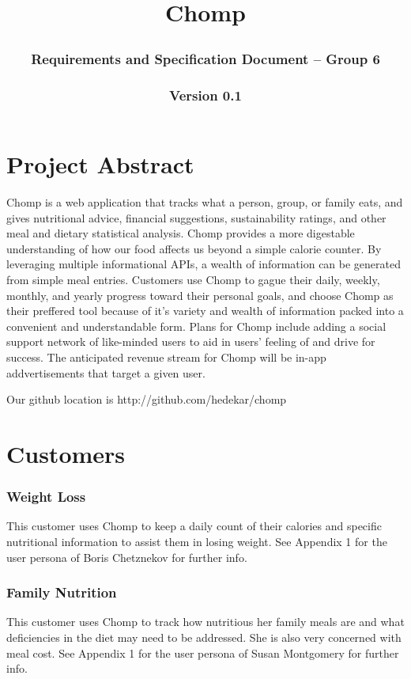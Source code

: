 \documentclass[a4paper,12pt]{article}
\begin{document}
\title{Chomp
\subsubsection*{Requirements and Specification Document -- Group 6}\subsubsection*{Version 0.1}
}\maketitle
\section*{Project Abstract}
Chomp is a web application that tracks what a person, group, or family eats, and gives nutritional advice, financial suggestions, sustainability ratings, and other meal and dietary statistical analysis.  Chomp provides a more digestable understanding of how our food affects us beyond a simple calorie counter.  By leveraging multiple informational APIs, a wealth of information can be generated from simple meal entries.  Customers use Chomp to gague their daily, weekly, monthly, and yearly progress toward their personal goals, and choose Chomp as their preffered tool because of it's variety and wealth of information packed into a convenient and understandable form.  Plans for Chomp include adding a social support network of like-minded users to aid in users' feeling of and drive for success.  The anticipated revenue stream for Chomp will be in-app addvertisements that target a given user.

Our github location is http://github.com/hedekar/chomp
\section*{Customers}
\subsubsection*{Weight Loss}
This customer uses Chomp to keep a daily count of their calories and specific nutritional information to assist them in losing weight.  See Appendix 1 for the user persona of Boris Chetznekov for further info.
\subsubsection*{Family Nutrition}
This customer uses Chomp to track how nutritious her family meals are and what deficiencies in the diet may need to be addressed.  She is also very concerned with meal cost.  See Appendix 1 for the user persona of Susan Montgomery for further info.
\end{document}

